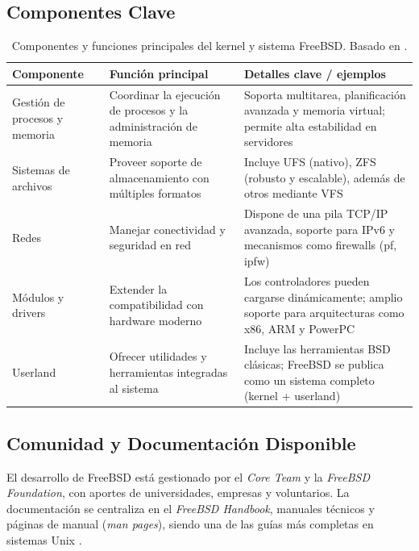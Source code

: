 \subsection{Componentes Clave}



\begin{table}[H]
\centering
\begin{tabular}{p{3.2cm}p{5cm}p{6cm}}
\hline
\textbf{Componente} & \textbf{Función principal} & \textbf{Detalles clave / ejemplos} \\
\hline
Gestión de procesos y memoria & Coordinar la ejecución de procesos y la administración de memoria & Soporta multitarea, planificación avanzada y memoria virtual; permite alta estabilidad en servidores \\
\hline
Sistemas de archivos & Proveer soporte de almacenamiento con múltiples formatos & Incluye UFS (nativo), ZFS (robusto y escalable), además de otros mediante VFS \\
\hline
Redes & Manejar conectividad y seguridad en red & Dispone de una pila TCP/IP avanzada, soporte para IPv6 y mecanismos como firewalls (pf, ipfw) \\
\hline
Módulos y drivers & Extender la compatibilidad con hardware moderno & Los controladores pueden cargarse dinámicamente; amplio soporte para arquitecturas como x86, ARM y PowerPC \\
\hline
Userland & Ofrecer utilidades y herramientas integradas al sistema & Incluye las herramientas BSD clásicas; FreeBSD se publica como un sistema completo (kernel + userland) \\
\hline
\end{tabular}
\caption[Componentes y funciones clave del kernel de FreeBSD]{Componentes y funciones principales del kernel y sistema FreeBSD. Basado en \textcite{freebsd-docs,freebsdfoundation}.}
\label{tab:componentes-freebsd}
\end{table}


\subsection{Comunidad y Documentación Disponible}
El desarrollo de FreeBSD está gestionado por el \textit{Core Team} y la \textit{FreeBSD Foundation}, con aportes de universidades, empresas y voluntarios.  
La documentación se centraliza en el \textit{FreeBSD Handbook}, manuales técnicos y páginas de manual (\textit{man pages}), siendo una de las guías más completas en sistemas Unix \parencite{freebsdfoundation}.


